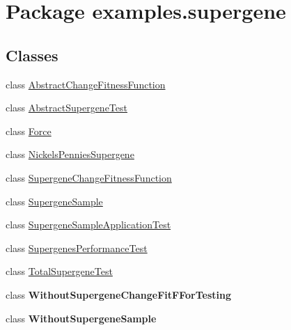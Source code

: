 \hypertarget{namespaceexamples_1_1supergene}{\section{Package examples.\-supergene}
\label{namespaceexamples_1_1supergene}
}
\subsection*{Classes}
\begin{DoxyCompactItemize}
\item 
class \hyperlink{classexamples_1_1supergene_1_1_abstract_change_fitness_function}{Abstract\-Change\-Fitness\-Function}
\item 
class \hyperlink{classexamples_1_1supergene_1_1_abstract_supergene_test}{Abstract\-Supergene\-Test}
\item 
class \hyperlink{classexamples_1_1supergene_1_1_force}{Force}
\item 
class \hyperlink{classexamples_1_1supergene_1_1_nickels_pennies_supergene}{Nickels\-Pennies\-Supergene}
\item 
class \hyperlink{classexamples_1_1supergene_1_1_supergene_change_fitness_function}{Supergene\-Change\-Fitness\-Function}
\item 
class \hyperlink{classexamples_1_1supergene_1_1_supergene_sample}{Supergene\-Sample}
\item 
class \hyperlink{classexamples_1_1supergene_1_1_supergene_sample_application_test}{Supergene\-Sample\-Application\-Test}
\item 
class \hyperlink{classexamples_1_1supergene_1_1_supergenes_performance_test}{Supergenes\-Performance\-Test}
\item 
class \hyperlink{classexamples_1_1supergene_1_1_total_supergene_test}{Total\-Supergene\-Test}
\item 
class {\bfseries Without\-Supergene\-Change\-Fit\-F\-For\-Testing}
\item 
class {\bfseries Without\-Supergene\-Sample}
\end{DoxyCompactItemize}
